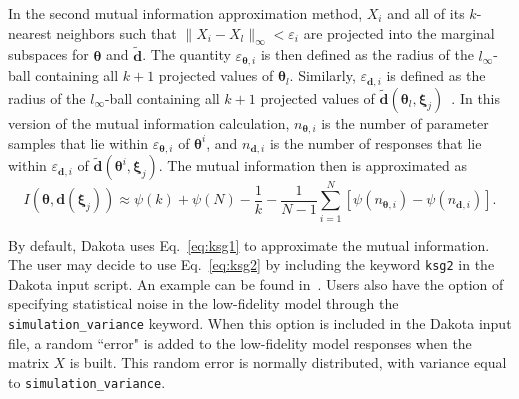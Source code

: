 In the second mutual information approximation method, $X_{i}$ and all of 
its $k$-nearest neighbors such that $\| X_{i} - X_{l} \|_{\infty} < 
\varepsilon_{i}$ are projected into the marginal subspaces for 
$\boldsymbol{\theta}$ and $\tilde{\boldsymbol{d}}$. The quantity 
$\varepsilon_{\boldsymbol{\theta},i}$ is then defined as the radius of the 
$l_{\infty}$-ball containing all $k+1$ projected values of 
$\boldsymbol{\theta}_{l}$. Similarly, $\varepsilon_{\boldsymbol{d},i}$ is 
defined as the radius of the $l_{\infty}$-ball containing all $k+1$ projected 
values of $\tilde{\boldsymbol{d}}(\boldsymbol{\theta}_{l}, 
\boldsymbol{\xi}_{j})$~\cite{Gao14}. In this version of the mutual information 
calculation, $n_{\boldsymbol{\theta},i}$ is the number of parameter samples 
that lie within $\varepsilon_{\boldsymbol{\theta},i}$ of 
$\boldsymbol{\theta}^{i}$, and $n_{\boldsymbol{d},i}$ is the number of 
responses that lie within $\varepsilon_{\boldsymbol{d}, i}$ of 
$\tilde{\boldsymbol{d}}(\boldsymbol{\theta}^{i}, \boldsymbol{\xi}_{j})$. 
The mutual information then is approximated as~\cite{Kra04}
\begin{equation}
\label{eq:ksg2}
I(\boldsymbol{\theta}, \boldsymbol{d}(\boldsymbol{\xi}_{j})) \approx
\psi(k) + \psi(N) - \frac{1}{k} - \frac{1}{N-1} \sum_{i = 1}^{N} \left[ 
\psi(n_{\boldsymbol{\theta},i}) - \psi(n_{\boldsymbol{d},i}) \right].
\end{equation}

By default, Dakota uses Eq.~\ref{eq:ksg1} to approximate the mutual
information. The user may decide to use Eq.~\ref{eq:ksg2} by including the
keyword \texttt{ksg2} in the Dakota input script. An example can be found 
in~\cite{RefMan}. Users also have the option of specifying statistical noise
in the low-fidelity model through the \texttt{simulation\_variance} keyword.
When this option is included in the Dakota input file, a random ``error" is
added to the low-fidelity model responses when the matrix $X$ is built. This
random error is normally distributed, with variance equal to
\texttt{simulation\_variance}.

